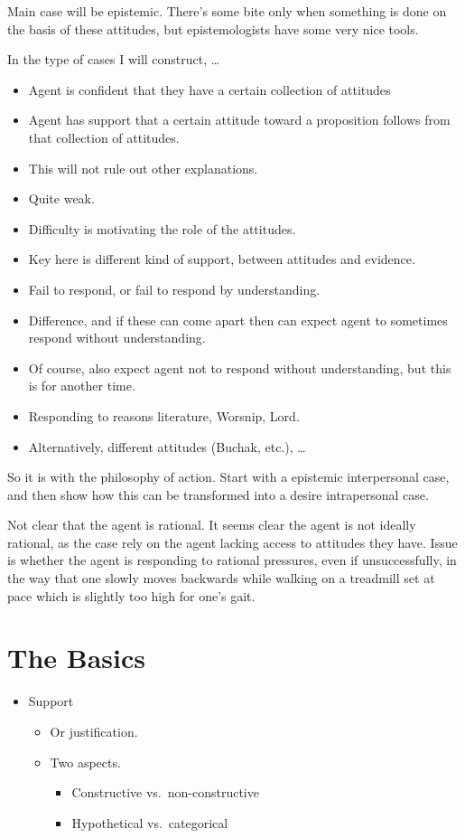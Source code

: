 \documentclass[10pt]{article}
\begin{document}
Main case will be epistemic.
There's some bite only when something is done on the basis of these attitudes, but epistemologists have some very nice tools.

In the type of cases I will construct, \dots
\begin{itemize}
\item Agent is confident that they have a certain collection of attitudes
\item Agent has support that a certain attitude toward a proposition follows from that collection of attitudes.
\item This will not rule out other explanations.
\item Quite weak.
\item Difficulty is motivating the role of the attitudes.
\item Key here is different kind of support, between attitudes and evidence.
\item Fail to respond, or fail to respond by understanding.
\item Difference, and if these can come apart then can expect agent to sometimes respond without understanding.
\item Of course, also expect agent not to respond without understanding, but this is for another time.
\item Responding to reasons literature, Worsnip, Lord.
\item Alternatively, different attitudes (Buchak, etc.), \dots
\end{itemize}

So it is with the philosophy of action.
Start with a epistemic interpersonal case, and then show how this can be transformed into a desire intrapersonal case.

Not clear that the agent is rational.
It seems clear the agent is not ideally rational, as the case rely on the agent lacking access to attitudes they have.
Issue is whether the agent is responding to rational pressures, even if unsuccessfully, in the way that one slowly moves backwards while walking on a treadmill set at pace which is slightly too high for one's gait.

\section{The Basics}
\label{sec:basics}

\begin{itemize}
\item Support
  \begin{itemize}
  \item Or justification.
  \item Two aspects.
    \begin{itemize}
    \item Constructive vs.\ non-constructive
    \item Hypothetical vs.\ categorical
    \end{itemize}
  \end{itemize}
\end{itemize}
\end{document}
